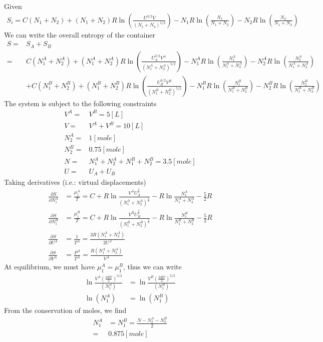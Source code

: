 \documentclass{article}
\numberwithin{equation}{section}
\begin{document}
Given
\begin{align*}
S_i=C(N_1+N_2)+(N_1+N_2)R\ln\left(\frac{U^{3/2}V}{(N_1+N_2)^{5/2}}\right)-N_1R\ln\left(\frac{N_1}{N_1+N_2}\right)-N_2R\ln\left(\frac{N_2}{N_1+N_2}\right)
\end{align*}
We can write the overall entropy of the container
\small
\begin{align*}
S=&S_A+S_B\\
 =&C(N_1^A+N_2^A)+(N_1^A+N_2^A)R\ln\left(\frac{U_A^{3/2}V^A}{(N_1^A+N_2^A)^{5/2}}\right)-N_1^AR\ln\left(\frac{N_1^A}{N_1^A+N_2^A}\right)-N_2^AR\ln\left(\frac{N_2^A}{N_1^A+N_2^A}\right)\\&+C(N_1^B+N_2^B)+(N_1^B+N_2^B)R\ln\left(\frac{U_B^{3/2}V^B}{(N_1^B+N_2^B)^{5/2}}\right)-N_1^BR\ln\left(\frac{N_1^B}{N_1^B+N_2^B}\right)-N_2^BR\ln\left(\frac{N_2^B}{N_1^B+N_2^B}\right)
\end{align*}
\normalsize
The system is subject to the following constraints
\begin{align*}
V^A=&V^B=5 [L]\\
V=&V^A+V^B=10 [L]\\
N_2^A=&1 [mole]\\
N_2^B=&0.75 [mole]\\
N=&N_1^A+N_2^A+N_1^B+N_2^B=3.5 [mole]\\
U=&U_A+U_B
\end{align*}
Taking derivatives (i.e.: virtual displacements)
\begin{align*}
\frac{\partial S}{\partial N_1^A}&=\frac{\mu_1^A}{T}=C+R\ln\frac{V^AU_A^{\frac{3}{2}}}{(N_1^A+N_2^A)^{\frac{5}{2}}}-R\ln\frac{N_1^A}{N_1^A+N_2^A}-\frac{5}{2}R\\
\frac{\partial S}{\partial N_1^B}&=\frac{\mu_1^B}{T}=C+R\ln\frac{V^BU_B^{\frac{3}{2}}}{(N_1^B+N_2^B)^{\frac{5}{2}}}-R\ln\frac{N_1^B}{N_1^B+N_2^B}-\frac{5}{2}R\\
\frac{\partial S}{\partial U^A}&=\frac{1}{T^A}=\frac{3R(N_1^A+N_2^A)}{2U^A}\\
\frac{\partial S}{\partial V^A}&=\frac{P^A}{T^A}=\frac{R(N_1^A+N_2^A)}{V^A}
\end{align*}
At equilibrium, we must have $\mu_1^A=\mu_1^B$, thus we can write
\begin{align*}
\ln\frac{V^A(\frac{3RT}{2})^{3/2}}{(N_1^A)}&=\ln\frac{V^B(\frac{3RT}{2})^{3/2}}{(N_1^B)}\\
\ln(N_1^A)&=\ln(N_1^B)
\end{align*}
From the conservation of moles, we find
\begin{align*}
N_1^A&=N_1^B=\frac{N-N_2^A-N_2^B}{2}\\
=&0.875 [mole]
\end{align*}
\end{document}

